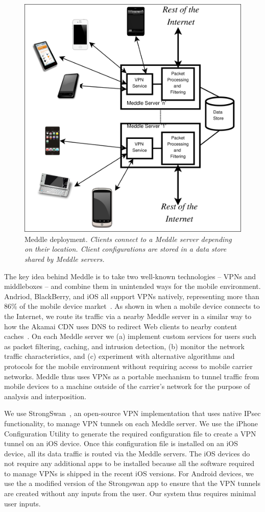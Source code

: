 \documentclass{sig-alternate-10pt}
\newcommand{\meddle}{{Meddle}\xspace}
\renewcommand{\fref}{\Fref}
\begin{document}
\begin{figure}
  \centering
  \includegraphics[width=0.7\columnwidth]{figures/meddle-servers.pdf}
  \caption{Meddle deployment. \emph{Clients connect to a \meddle
      server depending on their location. Client configurations are
      stored in a data store shared by \meddle servers.}} 
  \label{fig:MeddleDeployment}
\end{figure}

The key idea behind \meddle is to take two well-known technologies --
VPNs and middleboxes -- and combine them in unintended 
ways for the mobile environment. Andriod, BlackBerry, and iOS all
support VPNs natively, representing more than 86\% of the mobile
device market~\cite{gartner-phone-share}. As shown in
\fref{fig:MeddleDeployment} when a mobile device connects to the
Internet, we route its traffic via a nearby \meddle server in a
similar way to how the Akamai CDN uses DNS to redirect Web clients to
nearby content caches~\cite{akamai:cdn}. On each \meddle server we (a)
implement custom services for users such as packet filtering, caching,
and intrusion detection, (b) monitor the network traffic
characteristics, and (c) experiment with alternative algorithms and
protocols for the mobile environment without requiring access to
mobile carrier networks. \meddle thus uses VPNs as a portable
mechanism to tunnel  traffic from mobile devices to a machine outside
of the carrier's network for the purpose of analysis and
interposition. 

We use StrongSwan~\cite{strongswan}, an open-source VPN implementation
that uses native IPsec functionality, to manage VPN tunnels on each
\meddle server. We use the iPhone Configuration Utility to generate
the required configuration file to create a VPN tunnel on an iOS
device. Once this configuration file is installed on an iOS device,
all its data traffic is routed via the \meddle servers. The iOS
devices do not require any additional apps to be installed because all
the software required to manage VPNs is shipped in the recent iOS
versions. For Android devices, we use the a modified version of the
Strongswan app to ensure that the VPN tunnels are created without
any inputs from the user. Our system thus requires minimal user
inputs.  
\end{document}
